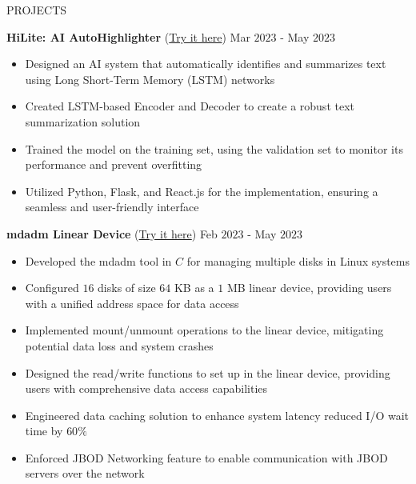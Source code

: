 \documentclass{resume} %
\begin{document}
\begin{rSection}{PROJECTS}

{\bf HiLite: AI AutoHighlighter }{(\href{https://github.com/harshitjain17/HiLite-AIAutoHighlighter}{Try it here})} \hfill Mar $2023$ - May $2023$
\begin{itemize}[itemsep = -4pt]
    \item Designed an AI system that automatically identifies and summarizes text using Long Short-Term Memory (LSTM) networks
    \item Created LSTM-based Encoder and Decoder to create a robust text summarization solution
    \item Trained the model on the training set, using the validation set to monitor its performance and prevent overfitting
    \item Utilized Python, Flask, and React.js for the implementation, ensuring a seamless and user-friendly interface
\end{itemize}

{\bf mdadm Linear Device }{(\href{https://github.com/harshitjain17/mdadm-Linear-Device}{Try it here})} \hfill Feb $2023$ - May $2023$
\begin{itemize}[itemsep = -4pt]
    \item Developed the mdadm tool in $C$ for managing multiple disks in Linux systems
    \item Configured $16$ disks of size $64$ KB as a $1$ MB linear device, providing users with a unified address space for data access
    \item Implemented mount/unmount operations to the linear device, mitigating potential data loss and system crashes
    \item Designed the read/write functions to set up in the linear device, providing users with comprehensive data access capabilities
    \item Engineered data caching solution to enhance system latency reduced I/O wait time by $60\%$
    \item Enforced JBOD Networking feature to enable communication with JBOD servers over the network
\end{itemize}


\end{rSection}
\end{document}
